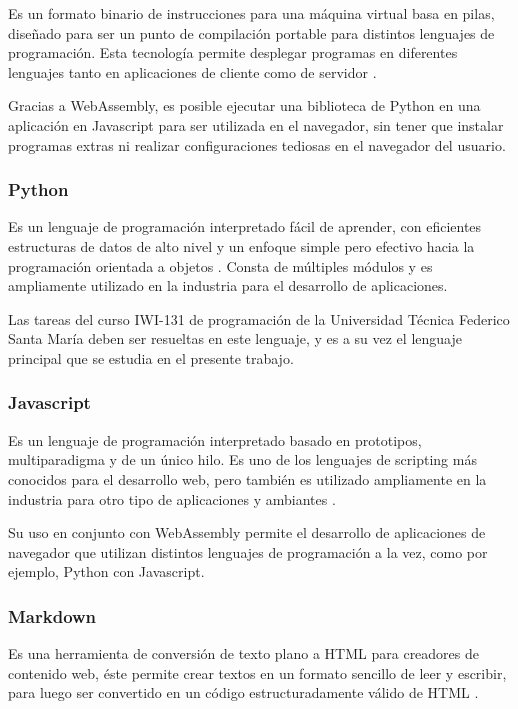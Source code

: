 \documentclass[letterpaper,12pt]{article}
\begin{document}
Es un formato binario de instrucciones para una máquina virtual basa en pilas, diseñado para ser un punto de compilación portable para distintos lenguajes de programación. Esta tecnología permite desplegar programas en diferentes lenguajes tanto en aplicaciones de cliente como de servidor \cite{WebAssemblyCoreSpecification2}.

Gracias a WebAssembly, es posible ejecutar una biblioteca de Python en una aplicación en Javascript para ser utilizada en el navegador, sin tener que instalar programas extras ni realizar configuraciones tediosas en el navegador del usuario.

\subsubsection{Python}

Es un lenguaje de programación interpretado fácil de aprender, con eficientes estructuras de datos de alto nivel y un enfoque simple pero efectivo hacia la programación orientada a objetos \cite{PythonWebsite}. Consta de múltiples módulos y es ampliamente utilizado en la industria para el desarrollo de aplicaciones.

Las tareas del curso IWI-131 de programación de la Universidad Técnica Federico Santa María deben ser resueltas en este lenguaje, y es a su vez el lenguaje principal que se estudia en el presente trabajo.

\subsubsection{Javascript}

Es un lenguaje de programación interpretado basado en prototipos, multiparadigma y de un único hilo. Es uno de los lenguajes de scripting más conocidos para el desarrollo web, pero también es utilizado ampliamente en la industria para otro tipo de aplicaciones y ambiantes \cite{MDNJavaScript}.

Su uso en conjunto con WebAssembly permite el desarrollo de aplicaciones de navegador que utilizan distintos lenguajes de programación a la vez, como por ejemplo, Python con Javascript.

\subsubsection{Markdown}

Es una herramienta de conversión de texto plano a HTML para creadores de contenido web, éste permite crear textos en un formato sencillo de leer y escribir, para luego ser convertido en un código estructuradamente válido de HTML \cite{DFMarkdown}.
\end{document}
